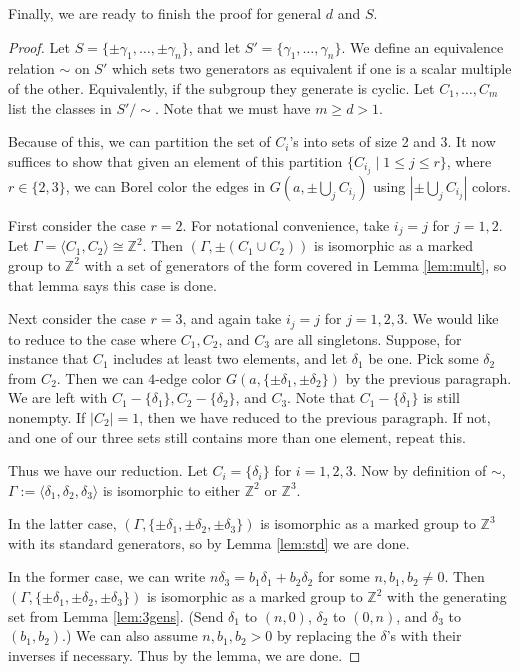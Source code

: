 \documentclass[10pt,a4paper]{article}
\newcommand{\0}{\varnothing}
\newcommand{\Z}{\mathbb{Z}}
\begin{document}
Finally, we are ready to finish the proof for general $d$ and $S$.

\begin{proof}
Let $S = \{\pm \gamma_1,\ldots,\pm \gamma_n\}$, and let $S' = \{\gamma_1,\ldots,\gamma_n\}$. We define an equivalence relation $\sim$ on $S'$ which sets two generators as equivalent if one is a scalar multiple of the other. Equivalently, if the subgroup they generate is cyclic. Let $C_1,\ldots,C_m$ list the classes in $S'/\sim$. Note that we must have $m \geq d > 1$.

Because of this, we can partition the set of $C_i$'s into sets of size 2 and 3. It now suffices to show that given an element of this partition $\{C_{i_j} \mid 1 \leq j \leq r\}$, where $r \in \{2,3\}$, we can Borel color the edges in $G(a,\pm \bigcup_j C_{i_j})$ using $|\pm \bigcup_j C_{i_j}|$ colors.

First consider the case $r = 2$. For notational convenience, take $i_j = j$ for $j=1,2$. Let $\Gamma = \langle C_1,C_2 \rangle \cong \Z^2$. Then $(\Gamma,\pm (C_1 \cup C_2))$ is isomorphic as a marked group to $\Z^2$ with a set of generators of the form covered in Lemma \ref{lem:mult}, so that lemma says this case is done.

Next consider the case $r=3$, and again take $i_j = j$ for $j=1,2,3$. We would like to reduce to the case where $C_1,C_2$, and $C_3$ are all singletons. Suppose, for instance that $C_1$ includes at least two elements, and let $\delta_1$ be one. Pick some $\delta_2$ from $C_2$. Then we can $4$-edge color $G(a,\{\pm \delta_1,\pm \delta_2\})$ by the previous paragraph. We are left with $C_1 - \{\delta_1\}, C_2 - \{\delta_2\}$, and $C_3$. Note that $C_1 - \{\delta_1\}$ is still nonempty. If $|C_2| = 1$, then we have reduced to the previous paragraph. If not, and one of our three sets still contains more than one element, repeat this.

Thus we have our reduction. Let $C_i = \{\delta_i\}$ for $i=1,2,3$. Now by definition of $\sim$, $\Gamma := \langle \delta_1,\delta_2,\delta_3 \rangle$ is isomorphic to either $\Z^2$ or $\Z^3$. 

In the latter case, $(\Gamma,\{\pm \delta_1,\pm \delta_2, \pm \delta_3\})$ is isomorphic as a marked group to $\Z^3$ with its standard generators, so by Lemma \ref{lem:std} we are done.

In the former case, we can write $n \delta_3 = b_1 \delta_1 + b_2 \delta_2$ for some $n,b_1,b_2 \neq 0$. Then $(\Gamma,\{\pm \delta_1,\pm \delta_2, \pm \delta_3\})$ is isomorphic as a marked group to $\Z^2$ with the generating set from Lemma \ref{lem:3gens}. (Send $\delta_1$ to $(n,0)$, $\delta_2$ to $(0,n)$, and $\delta_3$ to $(b_1,b_2)$.) We can also assume $n,b_1,b_2 > 0$ by replacing the $\delta$'s with their inverses if necessary. Thus by the lemma, we are done.
\end{proof}
\end{document}
